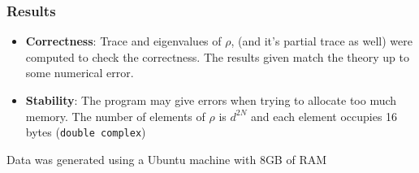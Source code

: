 \documentclass[pt12]{beamer}
\begin{document}
\begin{frame}[label=Results]
	\frametitle{Results}
	\tableofcontents[pausesections]
	\begin{itemize}
		\item \textbf{Correctness}: Trace and eigenvalues of $\rho$, (and it's partial trace as well) were computed to check the correctness. The results given match the theory up to some numerical error.
		\item \textbf{Stability}: The program may give errors when trying to allocate too much memory. The number of elements of $\rho$ is $d^{2N}$ and each element occupies 16 bytes (\texttt{double complex})
		\begin{figure}[h]
		\centering
		\hspace{-1cm}
		\end{figure}
	\end{itemize}
	\tiny{Data was generated using a Ubuntu machine with 8GB of RAM}
\end{frame}


\end{document}
